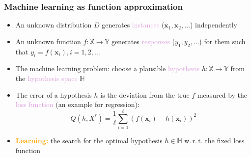 \documentclass[usenames,dvipsnames,aspectratio=169]{beamer}
\begin{document}
\begin{frame}
\frametitle{Machine learning as function approximation}

\begin{itemize}

\item An unknown distribution $D$
generates \textcolor{Plum}{instances} ($\mathbf{x}_1, \mathbf{x}_2, \ldots$)
independently

\pause
\item An unknown function 
$f: \mathbb{X} \to \mathbb{Y}$ generates \textcolor{Plum}{responses}
($y_1, y_2, \ldots$) for them
such that $y_i = f(\mathbf{x}_i), i=1, 2, \ldots$

\pause
\item The machine learning problem:
choose a plausible \textcolor{Plum}{hypothesis} 
$h: \mathbb{X} \to \mathbb{Y}$
from the \textcolor{Plum}{hypothesis space} $\mathbb{H}$


\pause
\item The error of a hypothesis $h$ is 
the deviation from the true $f$
measured by the \textcolor{Plum}{loss function} (an example for regression):
\[
    Q(h, X^{\ell}) = \frac {1} {\ell} 
    \sum\limits_{i=1} ^{\ell} 
        (f(\mathbf{x}_i) - h(\mathbf{x}_i))^2
\]

\pause 
\item \textcolor{orange}{\textbf{Learning:}} the search for the optimal 
hypothesis $h \in \mathbb{H}$ 
w.\,r.\,t. the fixed loss function

\end{itemize}

\end{frame}
\end{document}
